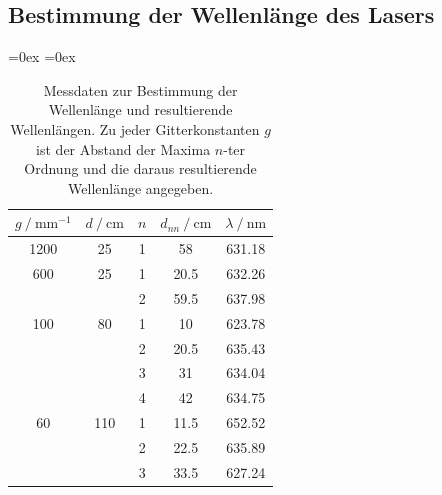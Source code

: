 \subsection{Bestimmung der Wellenlänge des Lasers}

\begin{table}
  \centering
  \aboverulesep=0ex %
  \belowrulesep=0ex %
  \caption{Messdaten zur Bestimmung der Wellenlänge und resultierende Wellenlängen. Zu jeder Gitterkonstanten $g$ ist der Abstand der Maxima $n$-ter Ordnung 
  und die daraus resultierende Wellenlänge angegeben.}
  \label{tab:wellenlänge}
  \begin{tabular}{S[table-format = 4.0] | S[table-format = 3.0] | S[table-format = 1.0] | S[table-format = 2.1] | S[table-format = 3.2]}
    {$g \mathbin{/} \unit{\milli\metre^{-1}}$} & {$d \mathbin{/} \unit{\centi\metre}$} & {$n$} & {$d_{nn} \mathbin{/} \unit{\centi\metre}$} & {$\lambda \mathbin{/} \unit{\nano\metre}$} \\
    \midrule
    \rule{0pt}{1.1EM}
    1200 & 25  & 1 &   58 & 631.18 \\
    \midrule
    \rule{0pt}{1.1EM}
     600 & 25  & 1 & 20.5 & 632.26 \\
         &     & 2 & 59.5 & 637.98 \\
    \midrule
    \rule{0pt}{1.1EM}
     100 & 80  & 1 &   10 & 623.78 \\
         &     & 2 & 20.5 & 635.43 \\
         &     & 3 &   31 & 634.04 \\
         &     & 4 &   42 & 634.75 \\
    \midrule
    \rule{0pt}{1.1EM}
      60 & 110 & 1 & 11.5 & 652.52 \\
         &     & 2 & 22.5 & 635.89 \\
         &     & 3 & 33.5 & 627.24 \\
  \end{tabular}
\end{table}

